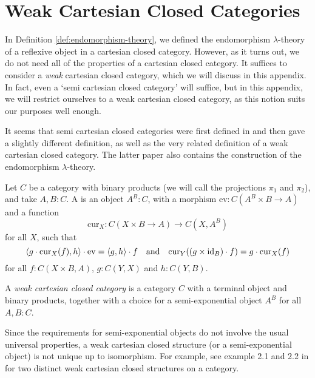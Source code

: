 \chapter{Weak Cartesian Closed Categories}\label{ch:weak-cartesian-closed-categories}
In Definition \ref{def:endomorphism-theory}, we defined the endomorphism $ \lambda $-theory of a reflexive object in a cartesian closed category. However, as it turns out, we do not need all of the properties of a cartesian closed category. It suffices to consider a \textit{weak} cartesian closed category, which we will discuss in this appendix. In fact, even a `semi cartesian closed category' will suffice, but in this appendix, we will restrict ourselves to a weak cartesian closed category, as this notion suits our purposes well enough.

It seems that semi cartesian closed categories were first defined in \autocite{hayashi-1985-semifunctors} and then \autocite{hoofman-1993-semi-cartesian-closed} gave a slightly different definition, as well as the very related definition of a weak cartesian closed category. The latter paper also contains the construction of the endomorphism $ \lambda $-theory.

\begin{definition}
  Let $ C $ be a category with binary products (we will call the projections $ \pi_1 $ and $ \pi_2 $), and take $ A, B : C $. A  is an object $ A^B : C $, with a morphism $ \mathrm{ev}: C(A^B \times B \to A) $ and a function
  \[ \mathrm{cur}_X: C(X \times B \to A) \to C(X, A^B) \]
  for all $ X $, such that
  \[ \langle g \cdot \mathrm{cur}_X(f), h \rangle \cdot \mathrm{ev} = \langle g, h \rangle \cdot f \quad \text{and} \quad \mathrm{cur}_Y((g \times \text{id}_{B}) \cdot f) = g \cdot \mathrm{cur}_X(f) \]
  for all $ f: C(X \times B, A) $, $ g : C(Y, X) $ and $ h : C(Y, B) $.
\end{definition}

\begin{definition}
  A \textit{weak cartesian closed category} is a category $ C $ with a terminal object and binary products, together with a choice for a semi-exponential object $ A^B $ for all $ A, B : C $.
\end{definition}

\begin{remark}
  Since the requirements for semi-exponential objects do not involve the usual universal properties, a weak cartesian closed structure (or a semi-exponential object) is not unique up to isomorphism. For example, see example 2.1 and 2.2 in \autocite{hoofman-1993-semi-cartesian-closed} for two distinct weak cartesian closed structures on a category.
\end{remark}

